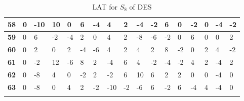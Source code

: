 \begin{longtable}[c]{|l|l|l|l|l|l|l|l|l|l|l|l|l|l|l|l|l|}
\textbf{58} & 0          & -10        & 10         & 0          & 6          & -4         & 4          & 2          & -4         & -2         & 6           & 0           & -2          & 0           & -4          & -2          \\ \hline
\textbf{59} & 0          & 6          & -2         & -4         & 2          & 0          & 4          & 2          & -8         & -6         & -2          & 0           & 6           & 0           & 0           & 2           \\ \hline
\textbf{60} & 0          & 2          & 0          & 2          & -4         & -6         & 4          & 2          & 4          & 2          & 8           & -2          & 0           & 2           & 4           & -2          \\ \hline
\textbf{61} & 0          & -2         & 12         & -6         & 8          & 2          & -4         & 6          & 4          & -2         & -4          & -2          & 4           & 2           & -4          & 2           \\ \hline
\textbf{62} & 0          & -8         & 4          & 0          & -2         & 2          & -2         & 6          & 10         & 6          & 2           & 2           & 0           & 0           & -4          & 0           \\ \hline
\textbf{63} & 0          & -8         & 0          & 4          & 2          & -2         & -10        & -2         & -6         & 6          & -2          & 6           & -4          & 4           & -4          & 0           \\ \hline
\caption{LAT for $S_8$ of DES}
\label{tbl:lat8}
\end{longtable}